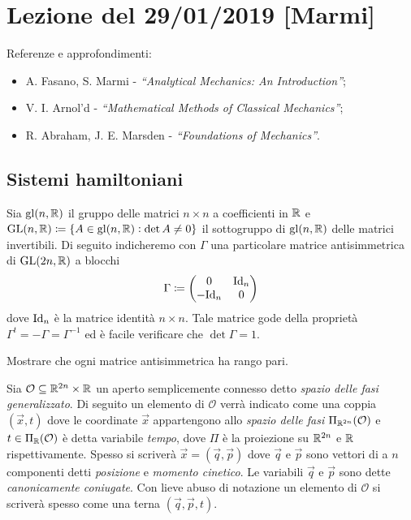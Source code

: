 \section{Lezione del 29/01/2019 [Marmi]}
Referenze e approfondimenti:
\begin{itemize}
    \item A. Fasano, S. Marmi - \emph{``Analytical Mechanics: An Introduction''};
    \item V. I. Arnol'd - \emph{``Mathematical Methods of Classical Mechanics''};
    \item R. Abraham, J. E. Marsden - \emph{``Foundations of Mechanics''}.
\end{itemize}

\subsection{Sistemi hamiltoniani}
Sia $ \mathrm{gl}(n, \mathbb{R}) $ il gruppo delle matrici $ n \times n $ a coefficienti in $ \mathbb{R} $ e $ {\mathrm{GL}(n, \mathbb{R}) \coloneqq \{A \in \mathrm{gl}(n, \mathbb{R}) : \det{A} \neq 0\}} $ il sottogruppo di $ \mathrm{gl}(n, \mathbb{R}) $ delle matrici invertibili. Di seguito indicheremo con $ \Gamma $ una particolare matrice antisimmetrica di $ \mathrm{GL}(2n, \mathbb{R}) $ a blocchi
\begin{equation}
    \Gamma \coloneqq
    \begin{pmatrix}
        0 & \mathrm{Id}_{n} \\
        -\mathrm{Id}_{n} & 0 \\
    \end{pmatrix}
\end{equation}
dove $ \mathrm{Id}_n $ è la matrice identità $ n \times n $. Tale matrice gode della proprietà $ \Gamma^t = -\Gamma = \Gamma^{-1} $ ed è facile verificare che $ \det{\Gamma} = 1 $. \\

\begin{exercise}
    Mostrare che ogni matrice antisimmetrica ha rango pari.
\end{exercise}

Sia $ \mathcal{O} \subseteq \mathbb{R}^{2n} \times \mathbb{R} $ un aperto semplicemente connesso detto \emph{spazio delle fasi generalizzato}. Di seguito un elemento di $ \mathcal{O} $ verrà indicato come una coppia $ (\vec{x}, t) $ dove le coordinate $ \vec{x} $ appartengono allo \emph{spazio delle fasi} $ \Pi_{\mathbb{R}^{2n}}(\mathcal{O}) $ e $ t \in \Pi_{\mathbb{R}}(\mathcal{O}) $ è detta variabile \emph{tempo}, dove $ \Pi $ è la proiezione su $ \mathbb{R}^{2n} $ e $ \mathbb{R} $ rispettivamente. Spesso si scriverà $ \vec{x} = (\vec{q}, \vec{p}) $ dove $ \vec{q} $ e $ \vec{p} $ sono vettori di a $ n $ componenti detti \emph{posizione} e \emph{momento cinetico}. Le variabili $ \vec{q} $ e $ \vec{p} $ sono dette \emph{canonicamente coniugate}. Con lieve abuso di notazione un elemento di $ \mathcal{O} $ si scriverà spesso come una terna $ (\vec{q}, \vec{p}, t) $. \\

